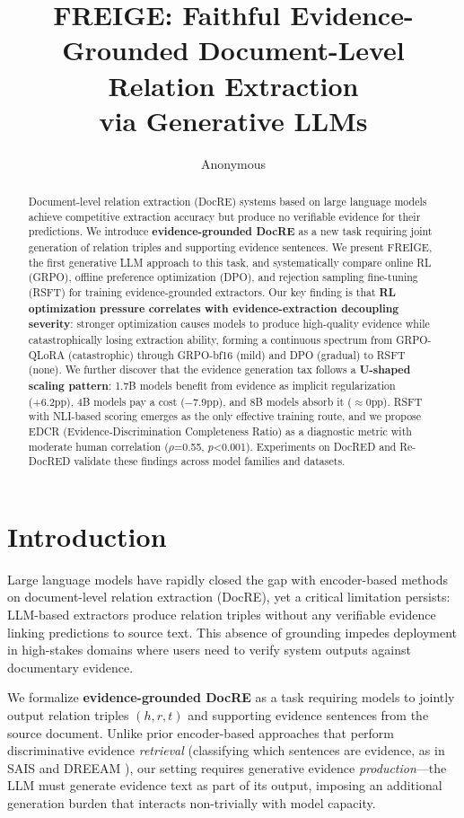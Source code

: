 \documentclass[11pt,a4paper]{article}
\title{FREIGE: Faithful Evidence-Grounded Document-Level Relation Extraction\\via Generative LLMs}
\author{Anonymous}
\begin{document}
\maketitle

\begin{abstract}
Document-level relation extraction (DocRE) systems based on large language models achieve competitive extraction accuracy but produce no verifiable evidence for their predictions. We introduce \textbf{evidence-grounded DocRE} as a new task requiring joint generation of relation triples and supporting evidence sentences. We present FREIGE, the first generative LLM approach to this task, and systematically compare online RL (GRPO), offline preference optimization (DPO), and rejection sampling fine-tuning (RSFT) for training evidence-grounded extractors. Our key finding is that \textbf{RL optimization pressure correlates with evidence-extraction decoupling severity}: stronger optimization causes models to produce high-quality evidence while catastrophically losing extraction ability, forming a continuous spectrum from GRPO-QLoRA (catastrophic) through GRPO-bf16 (mild) and DPO (gradual) to RSFT (none). We further discover that the evidence generation tax follows a \textbf{U-shaped scaling pattern}: 1.7B models benefit from evidence as implicit regularization (+6.2pp), 4B models pay a cost ($-$7.9pp), and 8B models absorb it ($\approx$0pp). RSFT with NLI-based scoring emerges as the only effective training route, and we propose EDCR (Evidence-Discrimination Completeness Ratio) as a diagnostic metric with moderate human correlation ($\rho$=0.55, $p$<0.001). Experiments on DocRED and Re-DocRED validate these findings across model families and datasets.
\end{abstract}

\section{Introduction}

Large language models have rapidly closed the gap with encoder-based methods on document-level relation extraction (DocRE), yet a critical limitation persists: LLM-based extractors produce relation triples without any verifiable evidence linking predictions to source text. This absence of grounding impedes deployment in high-stakes domains where users need to verify system outputs against documentary evidence.

We formalize \textbf{evidence-grounded DocRE} as a task requiring models to jointly output relation triples $(h, r, t)$ and supporting evidence sentences from the source document. Unlike prior encoder-based approaches that perform discriminative evidence \emph{retrieval} (classifying which sentences are evidence, as in SAIS \cite{xie2022erica} and DREEAM \cite{ma2023dreeam}), our setting requires generative evidence \emph{production}---the LLM must generate evidence text as part of its output, imposing an additional generation burden that interacts non-trivially with model capacity.
\end{document}
